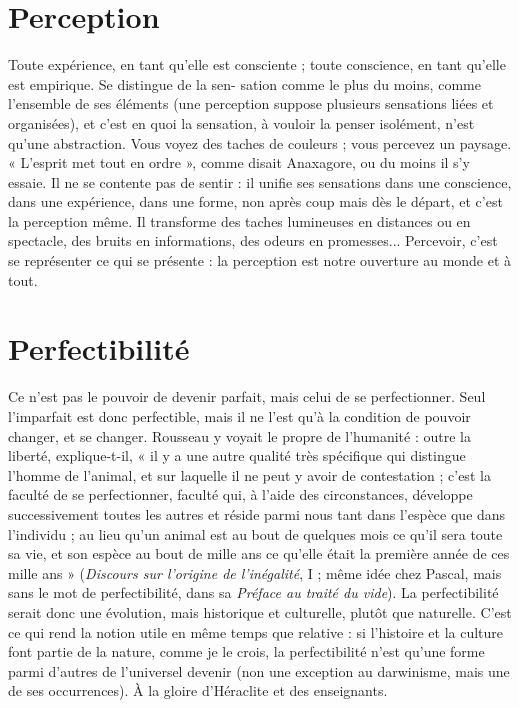 \section{Perception}
Toute expérience, en tant qu’elle est consciente ; toute conscience,
en tant qu'elle est empirique. Se distingue de la sen-
sation comme le plus du moins, comme l’ensemble de ses éléments (une perception
suppose plusieurs sensations liées et organisées), et c’est en quoi la
sensation, à vouloir la penser isolément, n’est qu’une abstraction. Vous voyez
des taches de couleurs ; vous percevez un paysage. « L'esprit met tout en
ordre », comme disait Anaxagore, ou du moins il s’y essaie. Il ne se contente
pas de sentir : il unifie ses sensations dans une conscience, dans une expérience,
dans une forme, non après coup mais dès le départ, et c’est la perception
même. Il transforme des taches lumineuses en distances ou en spectacle,
des bruits en informations, des odeurs en promesses... Percevoir, c’est se
représenter ce qui se présente : la perception est notre ouverture au monde et
à tout.

\section{Perfectibilité}
Ce n’est pas le pouvoir de devenir parfait, mais celui de
se perfectionner. Seul l’imparfait est donc perfectible,
mais il ne l’est qu’à la condition de pouvoir changer, et se changer. Rousseau y
voyait le propre de l'humanité : outre la liberté, explique-t-il, « il y a une autre
qualité très spécifique qui distingue l’homme de l’animal, et sur laquelle il ne
peut y avoir de contestation ; c’est la faculté de se perfectionner, faculté qui, à
l’aide des circonstances, développe successivement toutes les autres et réside
parmi nous tant dans l’espèce que dans l'individu ; au lieu qu’un animal est au
bout de quelques mois ce qu’il sera toute sa vie, et son espèce au bout de mille
ans ce qu’elle était la première année de ces mille ans » ({\it Discours sur l'origine de
l'inégalité}, I ; même idée chez Pascal, mais sans le mot de perfectibilité, dans sa
{\it Préface au traité du vide}). La perfectibilité serait donc une évolution, mais historique
et culturelle, plutôt que naturelle. C’est ce qui rend la notion utile en
même temps que relative : si l’histoire et la culture font partie de la nature,
comme je le crois, la perfectibilité n’est qu’une forme parmi d’autres de l’universel
devenir (non une exception au darwinisme, mais une de ses occurrences).
À la gloire d'Héraclite et des enseignants.

